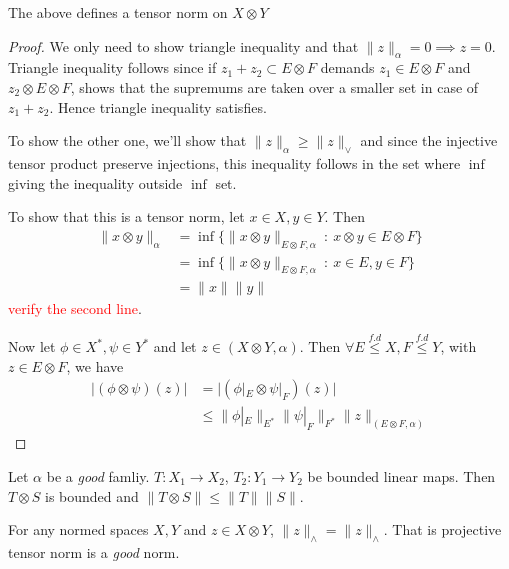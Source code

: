 \begin{lemma}
  The above defines a tensor norm on $X \otimes Y$
\end{lemma}
\begin{proof}
  We only need to show triangle inequality and that $\|z\|_\alpha = 0
  \implies z = 0$. Triangle inequality follows since if $z_1 + z_2
  \subset E \otimes F$ demands $z_1 \in E \otimes F$ and $z_2 \otimes
  E \otimes F$, shows that the supremums are taken over a smaller set
  in case of $z_1 + z_2$. Hence triangle inequality satisfies.

  To show the other one, we'll show that $\|z\|_\alpha \ge  \|z\|_{\vee}$
  and since the injective tensor product preserve injections, this inequality
  follows in the set where $\inf$ giving the inequality outside $\inf$ set.

  To show that this is a tensor norm, let $x \in X, y \in Y$. Then
  \begin{align*}
    \|x \otimes y \|_{\alpha} &= \inf \{ \|x \otimes y\|_{E \otimes
    F, \alpha} \ : \ x \otimes y \in E \otimes F \} \\
    &= \inf \{ \|x \otimes y\|_{E \otimes F, \alpha} \ : \ x \in E, y
    \in F \} \\
    &= \|x\|\|y\|
  \end{align*}
  \textcolor{red}{verify the second line}.

  Now let $\phi \in X^*, \psi \in Y^*$ and let $z \in (X \otimes Y,
  \alpha)$. Then $\forall E \stackrel{f.d}{\leqslant} X, F
  \stackrel{f.d}{\leqslant} Y$, with $z \in E \otimes F$, we have
  \begin{align*}
    \Big|(\phi \otimes \psi)(z)\Big| &=   \Big|(\phi|_E \otimes
    \psi|_F)(z)\Big| \\
    &\le \| \phi|_E\|_{E^*} \| \psi|_F\|_{F^*} \| z\|_{(E \otimes F, \alpha)}
  \end{align*}
\end{proof}

\begin{lemma}
  Let $\alpha$ be a \textit{good} famliy. $T: X_1 \to X_2$, $T_2: Y_1
  \to Y_2$ be bounded linear maps. Then $T \otimes S$ is bounded and
  $\|T \otimes S\| \le \|T\| \|S\|$.
\end{lemma}

\begin{lemma}
  For any normed spaces $X, Y$ and $z \in X \otimes Y$,
  $\|z\|_{\wedge} = \|z\|_{\wedge}$. That is projective tensor norm
  is a \textit{good} norm.
\end{lemma}
